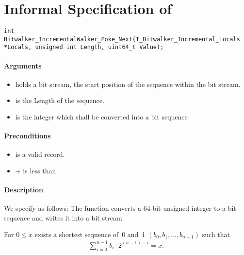 
\clearpage

\section{Informal Specification of }
\begin{lstlisting}[style=acsl-block]
int		 Bitwalker_IncrementalWalker_Poke_Next(T_Bitwalker_Incremental_Locals *Locals, unsigned int Length, uint64_t Value);
\end{lstlisting}

\paragraph{Arguments}

\begin{itemize}
    \item  {} holds a bit stream, the start position of the sequence within the bit stream.
   \item {} is the Length of the sequence.
   \item {} is the integer which shall be converted into a bit sequence
\end{itemize}

\paragraph{Preconditions}
\begin{itemize}
    \item  {} is a valid record.
    \item {} +  is less than 
\end{itemize}

\paragraph{Description}

We specify \pokenext as follows:
The function \poke converts a 64-bit unsigned integer to a bit sequence and 
writes it into a bit stream.

For $0 \leq x$ exists a shortest sequence of~0 and~1
$(b_0, b_1,\ldots,b_{n - 1})$
such that
\begin{align}
    \sum_{i=0}^{n-1} b_i \cdot 2^{(n - 1) - i} = x.
\end{align}

